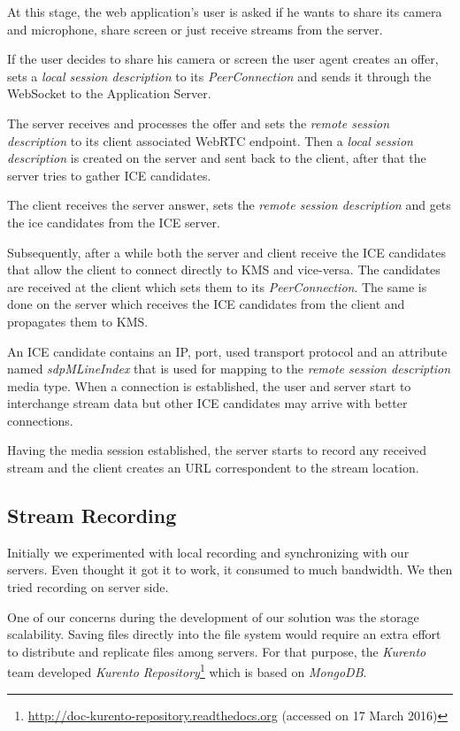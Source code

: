 \documentclass[conference,compsoc,a4paper]{IEEEtran}
\begin{document}
At this stage, the web application's user is asked if he wants to share its camera and microphone, share screen or just receive streams from the server. 

If the user decides to share his camera or screen the user agent creates an offer, sets a \emph{local session description} to its \emph{PeerConnection} and sends it through the WebSocket to the Application Server.

The server receives and processes the offer and sets the \emph{remote session description} to its client associated \gls{WebRTC} endpoint. Then a \emph{local session description} is created on the server and sent back to the client, after that the server tries to gather \gls{ICE} candidates.

The client receives the server answer, sets the \emph{remote session description} and gets the ice candidates from the \gls{ICE} server.

Subsequently, after a while both the server and client receive the \gls{ICE} candidates that allow the client to connect directly to \gls{KMS} and vice-versa. The candidates are received at the client which sets them to its \emph{PeerConnection}. The same is done on the server which receives the \gls{ICE} candidates from the client and propagates them to \gls{KMS}.


An \gls{ICE} candidate contains an \gls{IP}, port, used transport protocol and an attribute named \emph{sdpMLineIndex} that is used for mapping to the \emph{remote session description} media type.
When a connection is established, the user and server start to interchange stream data but other \gls{ICE} candidates may arrive with better connections.

Having the media session established, the server starts to record any received stream and the client creates an \gls{URL} correspondent to the stream location.

\subsection{Stream Recording}
 Initially we experimented with local recording and synchronizing with our servers. Even thought it got it to work, it consumed to much bandwidth. We then tried recording on server side.

	One of our concerns during the development of our solution was the storage scalability. Saving files directly into the file system would require an extra effort to distribute and replicate files among servers. For that purpose, the \emph{Kurento} team developed \emph{Kurento Repository}\footnote{\url{http://doc-kurento-repository.readthedocs.org} (accessed on 17 March 2016)} which is based on \emph{MongoDB}.
\end{document}
